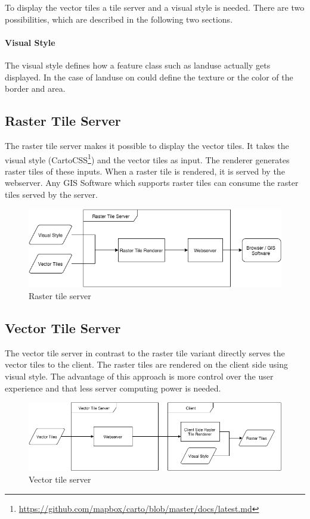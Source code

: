 To display the vector tiles a tile server and a visual style is needed. There are two possibilities, which are described in the following two sections.

\paragraph{Visual Style}
The visual style defines how a feature class such as landuse actually gets displayed. In the case of landuse on could define the texture or the color of the border and area.


\subsection{Raster Tile Server}

The raster tile server makes it possible to display the vector tiles. It takes the visual style (CartoCSS\footnote{\url{https://github.com/mapbox/carto/blob/master/docs/latest.md}}) and the vector tiles as input. The renderer generates raster tiles of these inputs. When a raster tile is rendered, it is served by the webserver. Any GIS Software which supports raster tiles can consume the raster tiles served by the server.

\begin{figure}[h]

  \centering
  \includegraphics[width=1\textwidth]{images/raster_tile_server.png}
  \caption{Raster tile server}
\end{figure}

\subsection{Vector Tile Server}

The vector tile server in contrast to the raster tile variant directly serves the vector tiles to the client. The raster tiles are rendered on the client side using visual style. The advantage of this approach is more control over the user experience and that less server computing power is needed.

\begin{figure}[h]

  \centering
  \includegraphics[width=1\textwidth]{images/vector_tile_server.png}
  \caption{Vector tile server}
\end{figure}

\newpage